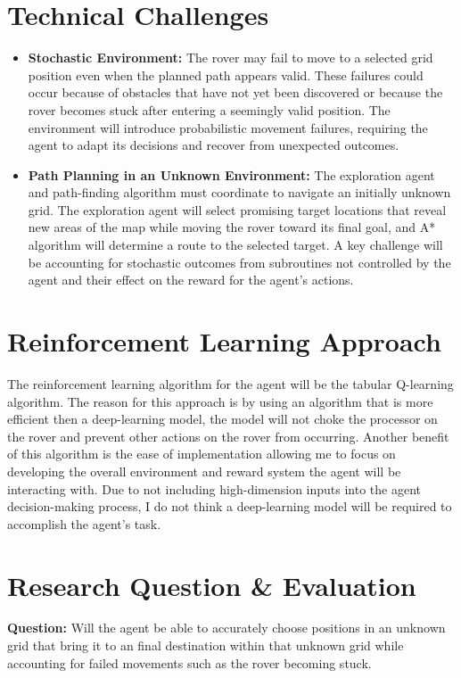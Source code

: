 \documentclass[12pt]{article}
\begin{document}
\section*{Technical Challenges}
\begin{itemize}
    \item \textbf{Stochastic Environment:} The rover may fail to move to a selected grid position even when the planned path appears valid.
    These failures could occur because of obstacles that have not yet been discovered or because the rover becomes stuck after entering a seemingly valid position.
    The environment will introduce probabilistic movement failures, requiring the agent to adapt its decisions and recover from unexpected outcomes.
    \item \textbf{Path Planning in an Unknown Environment:} The exploration agent and path-finding algorithm must coordinate to navigate an initially unknown grid.
    The exploration agent will select promising target locations that reveal new areas of the map while moving the rover toward its final goal, and A* algorithm will determine a route to the selected target.
    A key challenge will be accounting for stochastic outcomes from subroutines not controlled by the agent and their effect on the reward for the agent's actions.
\end{itemize}
\section*{Reinforcement Learning Approach}
The reinforcement learning algorithm for the agent will be the tabular Q-learning algorithm.
The reason for this approach is by using an algorithm that is more efficient then a deep-learning model, the model will not choke the processor on the rover and prevent other actions on the rover from occurring.
Another benefit of this algorithm is the ease of implementation allowing me to focus on developing the overall environment and reward system the agent will be interacting with.
Due to not including high-dimension inputs into the agent decision-making process, I do not think a deep-learning model will be required to accomplish the agent's task.

\section*{Research Question \& Evaluation}
\textbf{Question:} Will the agent be able to accurately choose positions in an unknown grid that bring it to an final destination within that unknown grid while accounting for failed movements such as the rover becoming stuck.
\end{document}

